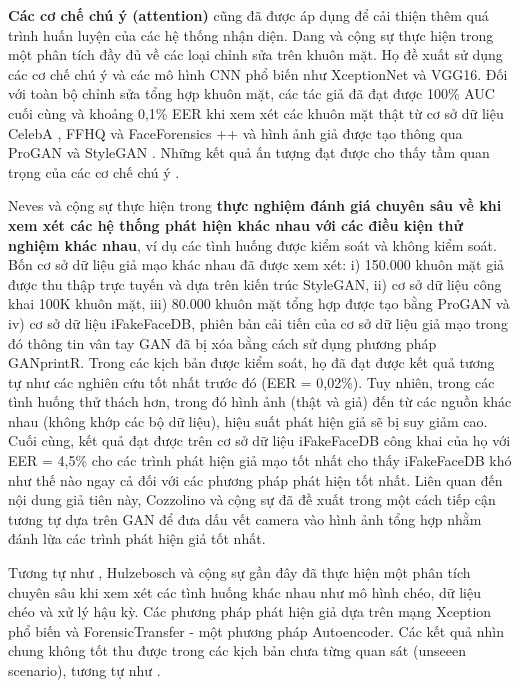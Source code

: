 \documentclass{article}
\begin{document}
\textbf{Các cơ chế chú ý (attention)} cũng đã được áp dụng để cải thiện thêm quá trình huấn luyện của các hệ thống nhận diện. Dang và cộng sự thực hiện trong  một phân tích đầy đủ về các loại chỉnh sửa trên khuôn mặt. Họ đề xuất sử dụng các cơ chế chú ý và các mô hình CNN phổ biến như XceptionNet và VGG16. Đối với toàn bộ chỉnh sửa tổng hợp khuôn mặt, các tác giả đã đạt được 100\% AUC cuối cùng và khoảng 0,1\% EER khi xem xét các khuôn mặt thật từ cơ sở dữ liệu CelebA , FFHQ  và FaceForensics ++  và hình ảnh giả được tạo thông qua ProGAN  và StyleGAN . Những kết quả ấn tượng đạt được cho thấy tầm quan trọng của các cơ chế chú ý .

Neves và cộng sự thực hiện trong  \textbf{thực nghiệm đánh giá chuyên sâu về khi xem xét các hệ thống phát hiện khác nhau với các điều kiện thử nghiệm khác nhau}, ví dụ các tình huống được kiểm soát và không kiểm soát. Bốn cơ sở dữ liệu giả mạo khác nhau đã được xem xét: i) 150.000 khuôn mặt giả được thu thập trực tuyến và dựa trên kiến trúc StyleGAN, ii) cơ sở dữ liệu công khai 100K khuôn mặt, iii) 80.000 khuôn mặt tổng hợp được tạo bằng ProGAN và iv) cơ sở dữ liệu iFakeFaceDB, phiên bản cải tiến của cơ sở dữ liệu giả mạo trong đó thông tin vân tay GAN đã bị xóa bằng cách sử dụng phương pháp GANprintR. Trong các kịch bản được kiểm soát, họ đã đạt được kết quả tương tự như các nghiên cứu tốt nhất trước đó (EER = 0,02\%). Tuy nhiên, trong các tình huống thử thách hơn, trong đó hình ảnh (thật và giả) đến từ các nguồn khác nhau (không khớp các bộ dữ liệu), hiệu suất phát hiện giả sẽ bị suy giảm cao. Cuối cùng, kết quả đạt được trên cơ sở dữ liệu iFakeFaceDB công khai của họ với EER = 4,5\% cho các trình phát hiện giả mạo tốt nhất cho thấy iFakeFaceDB khó như thế nào ngay cả đối với các phương pháp phát hiện tốt nhất. Liên quan đến nội dung giả tiên này, Cozzolino và cộng sự đã đề xuất trong  một cách tiếp cận tương tự dựa trên GAN để đưa dấu vết camera vào hình ảnh tổng hợp nhằm đánh lừa các trình phát hiện giả tốt nhất.

Tương tự như , Hulzebosch và cộng sự gần đây đã thực hiện  một phân tích chuyên sâu khi xem xét các tình huống khác nhau như mô hình chéo, dữ liệu chéo và xử lý hậu kỳ. Các phương pháp phát hiện giả dựa trên mạng Xception phổ biến và ForensicTransfer  - một phương pháp Autoencoder. Các kết quả nhìn chung không tốt thu được trong các kịch bản chưa từng quan sát (unseeen scenario), tương tự như .
\end{document}
